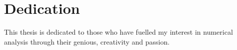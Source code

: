 % 
% 
%

\section*{Dedication}

This thesis is dedicated to those who have fuelled my interest in numerical analysis through their genious, creativity and passion. 

\clearpage
